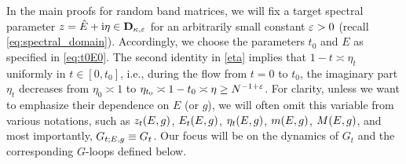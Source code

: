 
 
In the main proofs for random band matrices, we will fix a target spectral parameter $z=\hat{E}+\mathrm{i} \eta\in \mathbf D_{\kappa,{\varepsilon}}$ for an arbitrarily small constant ${\varepsilon}>0$ (recall \eqref{eq:spectral_domain}). Accordingly, we choose the parameters $t_0$ and $E$ as specified in \eqref{eq:t0E0}. The second identity in \eqref{eta} implies that $1-t\asymp \eta_t$ uniformly in $t\in [0,t_0]$, i.e., during the flow from $t=0$ to $t_0$, the imaginary part $\eta_t$ decreases from $\eta_0\asymp 1$ to $\eta_{t_0}\asymp 1-t_0 \asymp \eta \ge N^{-1+{\varepsilon}}$.  
For clarity, unless we want to emphasize their dependence on $E$ (or $g$), we will often omit this variable from various notations, such as $z_t(E,g)$, $E_t(E,g)$, $\eta_t(E,g)$, $m(E,g)$, $M(E,g)$, and most importantly, $G_{t;E,g}\equiv G_t$. Our focus will be on the dynamics of $G_{t}$ and the corresponding $G$-loops defined below. 


